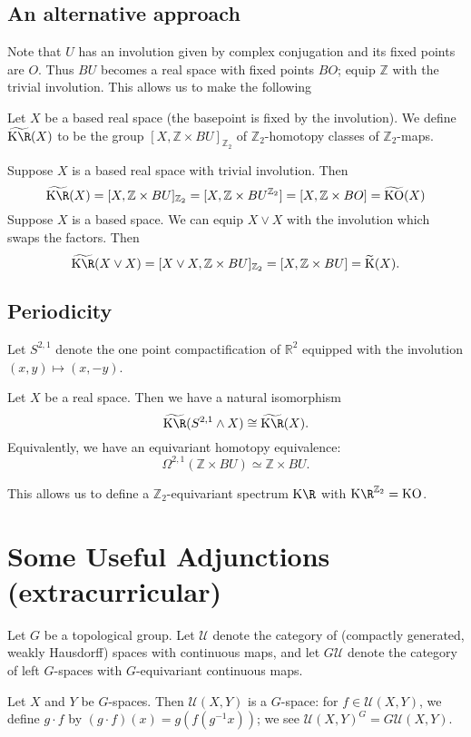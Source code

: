 \documentclass[11pt]{article}
\newcommand{\Extracurricular}[1]{
\section*{#1 {\small(extracurricular)}}
}
\begin{document}
\begin{FirstWeek}
\subsection*{An alternative approach}
Note that $U$ has an involution given by complex conjugation and its fixed points are $O$. Thus $BU$ becomes a real space with fixed points $BO$;  equip $\mathbb{Z}$ with the trivial involution. This allows us to make the following
\begin{defn*} Let $X$ be a based real space (the basepoint is fixed by the involution). We define $\widetilde{\KR}(X)$ to be the group $[X,\mathbb{Z}\times BU]_{\mathbb{Z}_2}$  of $\mathbb{Z}_2$-homotopy classes of $\mathbb{Z}_2$-maps.
\end{defn*}
Suppose $X$ is a based real space with trivial involution. Then \[\widetilde{\KR}(X)=[X,\mathbb{Z}\times BU]_{\mathbb{Z}_2}=[X,\mathbb{Z}\times BU^{\mathbb{Z}_2}]=[X,\mathbb{Z}\times BO]=\widetilde{\KO}(X)\]
Suppose $X$ is a based space. We can equip $X\vee X$ with the involution which swaps the factors. Then \[\widetilde{\KR}(X\vee X)=[X\vee X,\mathbb{Z}\times BU]_{\mathbb{Z}_2}=[X,\mathbb{Z}\times BU]=\widetilde{\K}(X).\]
\subsection*{Periodicity}
Let $S^{2,1}$  denote the one point compactification of $\mathbb{R}^2$ equipped with the involution $(x,y)\mapsto (x,-y)$.

\begin{thm*}
Let $X$ be a real space. Then we have a natural isomorphism
\[\widetilde{\KR}(S^{2,1}\wedge X)\cong\widetilde{\KR}(X).\] Equivalently, we have an equivariant homotopy equivalence:
\[\Omega^{2,1}(\mathbb{Z}\times BU)\simeq\mathbb{Z}\times BU.\]
\end{thm*}
\noindent This allows us to define a $\mathbb{Z}_2$-equivariant spectrum $\KR$ with $\KR^{\mathbb{Z}_2}=\KO$.

\Extracurricular{Some Useful Adjunctions}
Let $G$ be a topological group.
Let $\mathscr{U}$ denote the category of (compactly generated, weakly Hausdorff) spaces with continuous maps, and let $G\mathscr{U}$ denote the category of left $G$-spaces with $G$-equivariant continuous maps.

Let $X$ and $Y$ be $G$-spaces. Then $\mathscr{U}(X,Y)$ is a $G$-space: for $f\in\mathscr{U}(X,Y)$, we define $g\cdot f$ by  $(g\cdot f)(x)=g(f(g^{-1}x))$; we see $\mathscr{U}(X,Y)^G=G\mathscr{U}(X,Y)$.

\end{FirstWeek}
\end{document}
